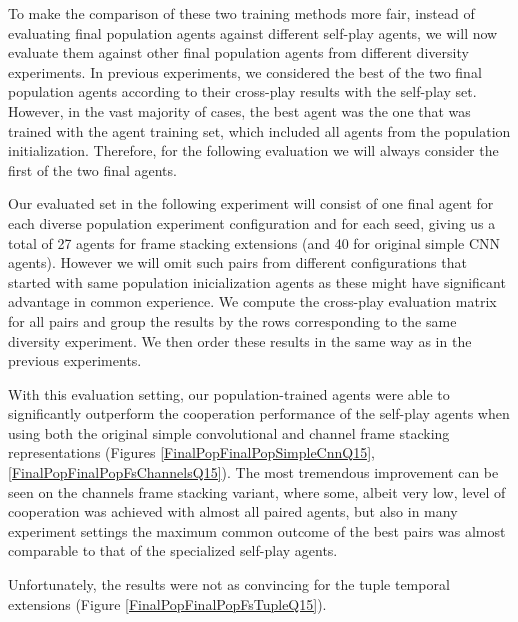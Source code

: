 To make the comparison of these two training methods more fair, instead of evaluating final population agents against different self-play agents, we will now evaluate them against other final population agents from different diversity experiments.
In previous experiments, we considered the best of the two final population agents according to their cross-play results with the self-play set.
However, in the vast majority of cases, the best agent was the one that was trained with the agent training set, which included all agents from the population initialization.
Therefore, for the following evaluation we will always consider the first of the two final agents.

Our evaluated set in the following experiment will consist of one final agent for each diverse population experiment configuration and for each seed, giving us a total of 27 agents for frame stacking extensions (and 40 for original simple CNN agents).
However we will omit such pairs from different configurations that started with same population inicialization agents as these might have significant advantage in common experience. 
We compute the cross-play evaluation matrix for all pairs and group the results by the rows corresponding to the same diversity experiment. 
We then order these results in the same way as in the previous experiments.

With this evaluation setting, our population-trained agents were able to significantly outperform the cooperation performance of the self-play agents when using both the original simple convolutional and channel frame stacking representations (Figures \ref{FinalPopFinalPopSimpleCnnQ15}, \ref{FinalPopFinalPopFsChannelsQ15}).
The most tremendous improvement can be seen on the channels frame stacking variant, where some, albeit very low, level of cooperation was achieved with almost all paired agents, but also in many experiment settings the maximum common outcome of the best pairs was almost comparable to that of the specialized self-play agents.

Unfortunately, the results were not as convincing for the tuple temporal extensions (Figure \ref{FinalPopFinalPopFsTupleQ15}).



